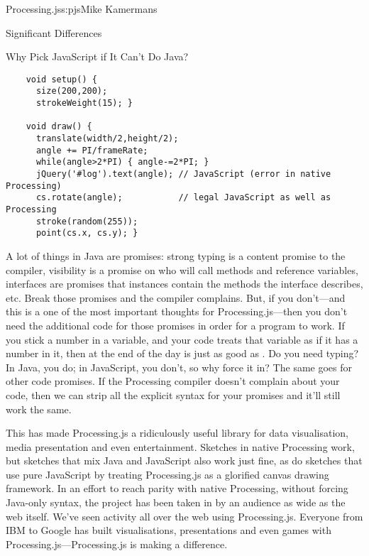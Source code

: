 \begin{aosachapter}{Processing.js}{s:pjs}{Mike Kamermans}
\begin{aosasect1}{Significant Differences}
\begin{aosasect2}{Why Pick JavaScript if It Can't Do Java?}
\begin{verbatim}
    void setup() {
      size(200,200);
      strokeWeight(15); }

    void draw() {
      translate(width/2,height/2);
      angle += PI/frameRate;
      while(angle>2*PI) { angle-=2*PI; }
      jQuery('#log').text(angle); // JavaScript (error in native Processing)
      cs.rotate(angle);           // legal JavaScript as well as Processing
      stroke(random(255));
      point(cs.x, cs.y); }
\end{verbatim}

A lot of things in Java are promises: strong typing is a content
promise to the compiler, visibility is a promise on who will call
methods and reference variables, interfaces are promises that
instances contain the methods the interface describes, etc. Break
those promises and the compiler complains. But, if you don't---and
this is a one of the most important thoughts for Processing.js---then
you don't need the additional code for those promises in order for a
program to work. If you stick a number in a variable, and your code
treats that variable as if it has a number in it, then at the end of
the day  is just as good as . Do you need
typing? In Java, you do; in JavaScript, you don't, so why force it in?
The same goes for other code promises. If the Processing compiler
doesn't complain about your code, then we can strip all the explicit
syntax for your promises and it'll still work the same.

This has made Processing.js a ridiculously useful library for data
visualisation, media presentation and even entertainment. Sketches in
native Processing work, but sketches that mix Java and JavaScript also
work just fine, as do sketches that use pure JavaScript by treating
Processing.js as a glorified canvas drawing framework. In an effort to
reach parity with native Processing, without forcing Java-only syntax,
the project has been taken in by an audience as wide as the web
itself. We've seen activity all over the web using
Processing.js. Everyone from IBM to Google has built visualisations,
presentations and even games with Processing.js---Processing.js is
making a difference.


\end{aosasect2}
\end{aosasect1}
\end{aosachapter}
